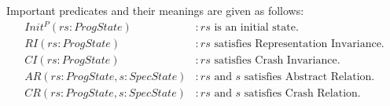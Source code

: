 \documentclass[letterpaper,twocolumn,10pt]{article}
\theoremstyle{definition}
\begin{document}
Important predicates and their meanings are given as follows:
\begin{align*}
	\mathit{Init^P(rs : ProgState)} &: \text{$\mathit{rs}$ is an initial state.}\\
	\mathit{RI(rs : ProgState)} &: \text{$\mathit{rs}$ satisfies Representation Invariance.} \\
	\mathit{CI(rs : ProgState)} &: \text{$\mathit{rs}$ satisfies Crash Invariance.} \\
	\mathit{AR(rs : ProgState, s : SpecState)} &: \text{$\mathit{rs}$ and $s$ satisfies Abstract Relation.} \\
	\mathit{CR(rs : ProgState, s : SpecState)} &: \text{$\mathit{rs}$ and $s$ satisfies Crash Relation.} \\
\end{align*}
\end{document}

